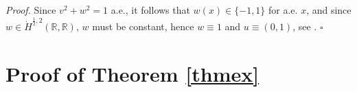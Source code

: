 \documentclass[12pt, a4paper]{article}
\newenvironment{proof}{\noindent\emph{Proof.}}{\hfill$\square$\medskip}
\newcommand{\R}{\mathbb{R}}
\newcommand{\ve}{\varepsilon}
\renewcommand{\(}{\left(}
\renewcommand{\)}{\right)}
\begin{document}
\begin{proof}
Since $v^2+w^2=1$ a.e., it follows that $w(x)\in \{-1,1\}$ for a.e.   $x$, and since $w\in \dot H^{\frac12,2}(\R,\R)$, $w$ must be constant, hence $w\equiv 1$ and $u\equiv (0,1)$,  see \cite[Corollary 6.2]{BM}.
\end{proof}


\section{Proof of Theorem \ref{thmex}}
\end{document}
